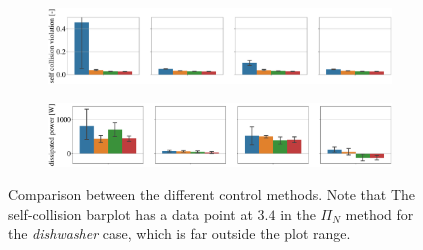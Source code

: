 \begin{figure}[t]
\vspace*{0.1cm}
\begin{subfigure}{\columnwidth}
    \includegraphics[width=\linewidth]{figures/methods_comparison/self_collision.pdf}
\end{subfigure} %
\hspace*{-0.2cm} 
\vspace*{0.1cm}
\begin{subfigure}{\columnwidth}
    \includegraphics[width=\linewidth]{figures/methods_comparison/dissipated_power.pdf}
\end{subfigure}
\hfill
\caption{Comparison between the different control methods. Note that The self-collision barplot has a data point at $3.4$ in the $\Pi_{N}$ method for the \textit{dishwasher} case, which is far outside the plot range.}\label{fig:methods_comparison}
\end{figure}

\vspace{0.3cm}
